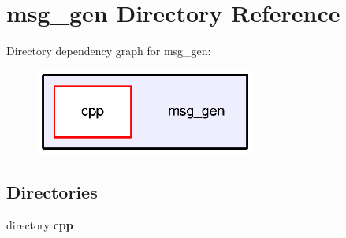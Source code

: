 \section{msg\-\_\-gen Directory Reference}
\label{dir_b267ad68c09e05aa6d181ecb02325ef8}
Directory dependency graph for msg\-\_\-gen\-:
\nopagebreak
\begin{figure}[H]
\begin{center}
\leavevmode
\includegraphics[width=204pt]{dir_b267ad68c09e05aa6d181ecb02325ef8_dep}
\end{center}
\end{figure}
\subsection*{Directories}
\begin{DoxyCompactItemize}
\item 
directory {\bf cpp}
\end{DoxyCompactItemize}
